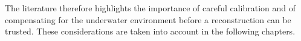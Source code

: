 The literature therefore highlights the importance of careful calibration and of compensating for the underwater
environment before a reconstruction can be trusted. These considerations are taken into account in the following chapters.



%
%
%



